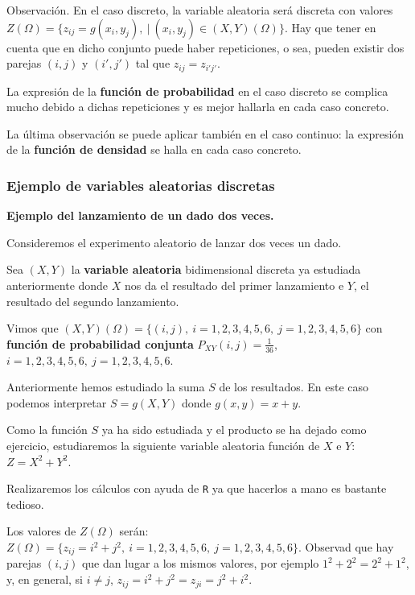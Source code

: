 \documentclass[]{book}
\begin{document}
Observación.
En el caso discreto, la variable aleatoria será discreta con valores \(Z(\Omega)=\{z_{ij}=g(x_i,y_j),\ |\ (x_i,y_j)\in (X,Y)(\Omega)\}\).
Hay que tener en cuenta que en dicho conjunto puede haber repeticiones, o sea, pueden existir dos parejas \((i,j)\) y \((i',j')\) tal que \(z_{ij}=z_{i'j'}\).

La expresión de la \textbf{función de probabilidad} en el caso discreto se complica mucho debido a dichas repeticiones y es mejor hallarla en cada caso concreto.

La última observación se puede aplicar también en el caso continuo: la expresión de la \textbf{función de densidad} se halla en cada caso concreto.

\hypertarget{ejemplo-de-variables-aleatorias-discretas}{%
\subsubsection{Ejemplo de variables aleatorias discretas}\label{ejemplo-de-variables-aleatorias-discretas}}

\textbf{Ejemplo del lanzamiento de un dado dos veces.}

Consideremos el experimento aleatorio de lanzar dos veces un dado.

Sea \((X,Y)\) la \textbf{variable aleatoria} bidimensional discreta ya estudiada anteriormente donde \(X\) nos da el resultado del primer lanzamiento e \(Y\), el resultado del segundo lanzamiento.

Vimos que \((X,Y)(\Omega)=\{(i,j),\ i=1,2,3,4,5,6,\ j=1,2,3,4,5,6\}\) con \textbf{función de probabilidad conjunta} \(P_{XY}(i,j)=\frac{1}{36}\), \(i=1,2,3,4,5,6,\ j=1,2,3,4,5,6.\)

Anteriormente hemos estudiado la suma \(S\) de los resultados. En este caso podemos interpretar \(S=g(X,Y)\) donde \(g(x,y)=x+y\).

Como la función \(S\) ya ha sido estudiada y el producto se ha dejado como ejercicio, estudiaremos la siguiente variable aleatoria función de \(X\) e \(Y\): \(Z=X^2+Y^2\).

Realizaremos los cálculos con ayuda de \texttt{R} ya que hacerlos a mano es bastante tedioso.

Los valores de \(Z(\Omega)\) serán: \(Z(\Omega)=\{z_{ij}=i^2+j^2,\ i=1,2,3,4,5,6,\ j=1,2,3,4,5,6\}\). Observad que hay parejas \((i,j)\) que dan lugar a los mismos valores, por ejemplo \(1^2+2^2 = 2^2+1^2\), y, en general, si \(i\neq j\), \(z_{ij}=i^2+j^2=z_{ji}=j^2+i^2\).
\end{document}
